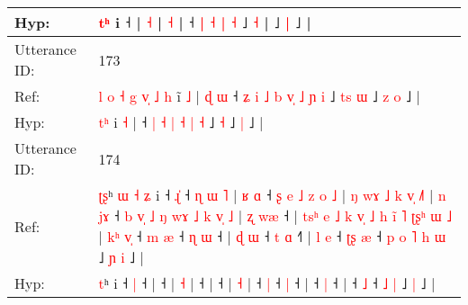 \documentclass[10pt]{article}
\DeclareRobustCommand{\hl}[1]{{\textcolor{red}{#1}}}
\begin{document}
\begin{longtable}{ll}
 \\
Hyp: & \hl{}\hl{}\hl{}\hl{t}\hl{ʰ} i ˧\hl{}\hl{}\hl{}\hl{}\hl{}\hl{}\hl{}\hl{}\hl{}\hl{}\hl{}\hl{}\hl{}\hl{}\hl{}\hl{}\hl{}\hl{}\hl{} |\hl{}\hl{}\hl{}\hl{}\hl{}\hl{}\hl{}\hl{}\hl{}\hl{} \hl{}\hl{˧} |\hl{}\hl{}\hl{}\hl{}\hl{} \hl{˧} |\hl{}\hl{}\hl{}\hl{} ˧\hl{}\hl{}\hl{}\hl{}\hl{}\hl{}\hl{}\hl{}\hl{} \hl{|} \hl{˧} \hl{|} \hl{}\hl{˧} ˩\hl{}\hl{}\hl{}\hl{} \hl{˧} |\hl{}\hl{} ˩\hl{}\hl{} \hl{|} ˩ |
 \\
\midrule
Utterance ID: & 173 \\
Ref: & \hl{l}\hl{ }\hl{o}\hl{ }\hl{˧}\hl{ }\hl{g}\hl{ }\hl{v}\hl{̩}\hl{ }\hl{˩}\hl{ }\hl{h} i\hl{̃} \hl{˩} |\hl{ }\hl{ɖ}\hl{ }\hl{ɯ} ˧\hl{ }\hl{ʑ}\hl{ }\hl{i} \hl{˩} \hl{b} \hl{v}\hl{̩} \hl{˩} \hl{ɲ} \hl{i} ˩\hl{ }\hl{t}\hl{s} \hl{ɯ} ˩\hl{ }\hl{z} \hl{o} ˩ |
 \\
Hyp: & \hl{}\hl{}\hl{}\hl{}\hl{}\hl{}\hl{}\hl{}\hl{}\hl{}\hl{}\hl{}\hl{t}\hl{ʰ} i\hl{} \hl{˧} |\hl{}\hl{}\hl{}\hl{} ˧\hl{}\hl{}\hl{}\hl{} \hl{|} \hl{˧} \hl{}\hl{|} \hl{˧} \hl{|} \hl{˧} ˩\hl{}\hl{}\hl{} \hl{˧} ˩\hl{}\hl{} \hl{|} ˩ |
 \\
\midrule
Utterance ID: & 174 \\
Ref: & \hl{ʈ}\hl{ʂ}ʰ\hl{ }\hl{ɯ}\hl{ }\hl{˧}\hl{ }\hl{ʑ} i ˧ \hl{ɻ}\hl{̍} ˧\hl{ }\hl{ɳ}\hl{ }\hl{ɯ}\hl{ }\hl{˥} |\hl{ }\hl{ʁ}\hl{ }\hl{ɑ} ˧\hl{ }\hl{ʂ}\hl{ }\hl{e}\hl{ }\hl{˩}\hl{ }\hl{z}\hl{ }\hl{o}\hl{ }\hl{˩} |\hl{ }\hl{ŋ}\hl{ }\hl{w}\hl{ɤ}\hl{ }\hl{˩}\hl{ }\hl{k}\hl{ }\hl{v}\hl{̩} \hl{˩}\hl{˥} |\hl{ }\hl{n}\hl{ }\hl{j}\hl{ɤ} ˧\hl{ }\hl{b}\hl{ }\hl{v}\hl{̩}\hl{ }\hl{˩}\hl{ }\hl{ŋ}\hl{ }\hl{w}\hl{ɤ}\hl{ }\hl{˩}\hl{ }\hl{k}\hl{ }\hl{v}\hl{̩}\hl{ }\hl{˩} |\hl{ }\hl{ʐ}\hl{ }\hl{w}\hl{æ} ˧ |\hl{ }\hl{t}\hl{s}\hl{ʰ}\hl{ }\hl{e}\hl{ }\hl{˩}\hl{ }\hl{k}\hl{ }\hl{v}\hl{̩}\hl{ }\hl{˩}\hl{ }\hl{h}\hl{ }\hl{i}\hl{̃}\hl{ }\hl{˥}\hl{ }\hl{ʈ}\hl{ʂ}\hl{ʰ}\hl{ }\hl{ɯ} \hl{˩} |\hl{ }\hl{k}\hl{ʰ}\hl{ }\hl{v}\hl{̩} ˧\hl{ }\hl{m} \hl{æ} ˧\hl{ }\hl{ɳ} \hl{ɯ} ˧ |\hl{ }\hl{ɖ}\hl{ }\hl{ɯ} ˧\hl{ }\hl{t} \hl{ɑ} ˧\hl{˥} |\hl{ }\hl{l}\hl{ }\hl{e} ˧\hl{ }\hl{ʈ}\hl{ʂ} \hl{æ} ˧\hl{ }\hl{p}\hl{ }\hl{o}\hl{ }\hl{˥} \hl{h} \hl{ɯ} ˩\hl{ }\hl{ɲ} \hl{i} ˩ |
 \\
Hyp: & \hl{}\hl{t}ʰ\hl{}\hl{}\hl{}\hl{}\hl{}\hl{} i ˧ \hl{}\hl{|} ˧\hl{}\hl{}\hl{}\hl{}\hl{}\hl{} |\hl{}\hl{}\hl{}\hl{} ˧\hl{}\hl{}\hl{}\hl{}\hl{}\hl{}\hl{}\hl{}\hl{}\hl{}\hl{}\hl{} |\hl{}\hl{}\hl{}\hl{}\hl{}\hl{}\hl{}\hl{}\hl{}\hl{}\hl{}\hl{} \hl{}\hl{˧} |\hl{}\hl{}\hl{}\hl{}\hl{} ˧\hl{}\hl{}\hl{}\hl{}\hl{}\hl{}\hl{}\hl{}\hl{}\hl{}\hl{}\hl{}\hl{}\hl{}\hl{}\hl{}\hl{}\hl{}\hl{}\hl{}\hl{} |\hl{}\hl{}\hl{}\hl{}\hl{} ˧ |\hl{}\hl{}\hl{}\hl{}\hl{}\hl{}\hl{}\hl{}\hl{}\hl{}\hl{}\hl{}\hl{}\hl{}\hl{}\hl{}\hl{}\hl{}\hl{}\hl{}\hl{}\hl{}\hl{}\hl{}\hl{}\hl{}\hl{}\hl{} \hl{˧} |\hl{}\hl{}\hl{}\hl{}\hl{}\hl{} ˧\hl{}\hl{} \hl{|} ˧\hl{}\hl{} \hl{|} ˧ |\hl{}\hl{}\hl{}\hl{} ˧\hl{}\hl{} \hl{|} ˧\hl{} |\hl{}\hl{}\hl{}\hl{} ˧\hl{}\hl{}\hl{} \hl{˩} ˧\hl{}\hl{}\hl{}\hl{}\hl{}\hl{} \hl{˩} \hl{|} ˩\hl{}\hl{} \hl{|} ˩ |

\end{longtable}
\end{document}
